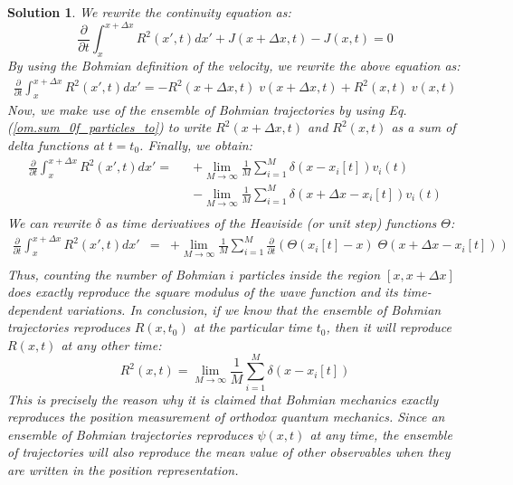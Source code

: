 \documentclass[nofootinbib, secnumarabic, amsmath, nobibnotes,10pt,aps,pra]{revtex4-1}
\newtheorem{solution}{Solution}
\newcommand{\eref}[1]{Eq. (\ref{#1})}
\begin{document}
\begin{solution}
We rewrite the continuity equation as:
\begin{equation}
\frac {\partial} {\partial t} \int_{x}^{x + \Delta x} R^2(x',t) dx' + J(x + \Delta x,t) - J(x,t) = 0\nonumber
\label{om.ppre6_1}
\end{equation}
By using the Bohmian definition of the velocity, we rewrite the above equation as:
\begin{eqnarray}
\frac {\partial} {\partial t} \int_{x}^{x + \Delta x} R^2(x',t) dx' = - { R^2(x + \Delta x,t) \; v(x + \Delta x,t) + R^2(x,t) \; v(x,t)}\nonumber
\label{om.ppre6_2}
\end{eqnarray}
Now, we make use of the ensemble of Bohmian trajectories by using
\eref{om.sum_0f_particles_to} to write $R^2(x + \Delta x,t)$ and
$R^2(x,t)$ as a sum of delta functions at $t = t_0$. Finally, we
obtain:
\begin{eqnarray}
\frac {\partial} {\partial t} \int_{x}^{x + \Delta x} R^2(x',t) dx' =
&&+ \lim_{M\rightarrow\infty} \frac {1} {M} \sum_{i = 1}^{M} \delta(x - x_i[t]) v_i(t) \nonumber\\&&-\lim_{M\rightarrow\infty} \frac {1} {M} \sum_{i = 1}^{M} \delta(x + \Delta x - x_i[t]) v_i(t)\nonumber\\
\label{om.ppre6_3}
\end{eqnarray}
We can rewrite $\delta$ as time derivatives of the Heaviside (or
unit step) functions $\Theta$:
\begin{eqnarray}
\frac {\partial} {\partial t} \int_{x}^{x + \Delta x} R^2(x',t) dx' &=&
+ \lim_{M\rightarrow\infty} \frac {1} {M} \sum_{i = 1}^{M} \frac {\partial} {\partial t} \left( \Theta(x_i[t] - x) \; \Theta (x + \Delta x - x_i[t]) \right)\quad\qquad\nonumber\\
\label{om.ppre6_4}
\end{eqnarray}
Thus, counting the number of Bohmian $i$ particles inside the region
$[x,x + \Delta x]$ does exactly reproduce the square modulus of the
wave function and its time-dependent variations. In conclusion, if
we know that the ensemble of Bohmian trajectories reproduces
$R(x,t_0)$ at the particular time $t_0$, then it will reproduce
$R(x,t)$ at any other time:
\begin{equation}
R^2(x,t) = \lim_{M\rightarrow\infty} \frac {1} {M}  \sum_{i = 1}^{M} \delta(x - x_i[t])\nonumber
\end{equation}
This is precisely the reason why it is claimed that Bohmian mechanics exactly reproduces the position measurement of orthodox quantum mechanics. Since an ensemble of Bohmian trajectories reproduces $\psi(x,t)$ at any time, the ensemble of trajectories will also reproduce the mean value of other observables when they are written in the position representation.\\
\end{solution}
\end{document}

